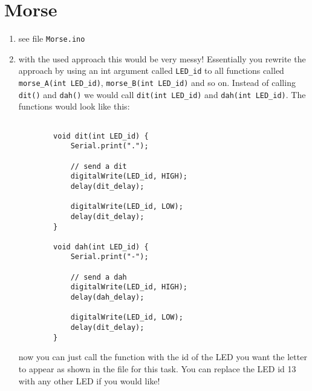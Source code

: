 \documentclass[12pt]{article}
\begin{document}
    \newpage
\section{Morse}

\begin{enumerate}
    \item
        see file \verb!Morse.ino!
    \item
        with the used approach this would be very messy! Essentially you rewrite the approach by using an int argument called \verb!LED_id! to all functions called \verb!morse_A(int LED_id)!, \verb!morse_B(int LED_id)! and so on. Instead of calling \verb! dit()! and \verb!dah()! we would call \verb!dit(int LED_id)! and \verb!dah(int LED_id)!. The functions would look like this:\\

        \begin{lstlisting}[frame=single]  % Start your code-block

        void dit(int LED_id) {
            Serial.print(".");

            // send a dit
            digitalWrite(LED_id, HIGH);
            delay(dit_delay);

            digitalWrite(LED_id, LOW);
            delay(dit_delay);
        }

        void dah(int LED_id) {
            Serial.print("-");
          
            // send a dah
            digitalWrite(LED_id, HIGH);
            delay(dah_delay);

            digitalWrite(LED_id, LOW);
            delay(dit_delay);
        }

        \end{lstlisting}

        now you can just call the function with the id of the LED you want the letter to appear as shown in the file for this task. You can replace the LED id 13 with any other LED if you would like!

\end{enumerate}
\end{document}
